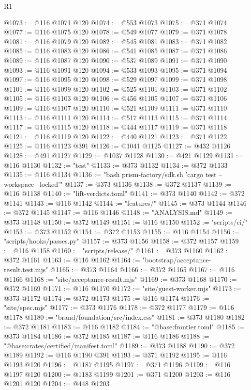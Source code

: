 \begin{lexlean}{R1}
\begin{coremodule}
@1073 := @116 @1071 @120
@1074 := @553 @1073
@1075 := @371 @1074
@1077 := @116 @1075 @120
@1078 := @549 @1077
@1079 := @371 @1078
@1081 := @116 @1079 @120
@1082 := @545 @1081
@1083 := @371 @1082
@1085 := @116 @1083 @120
@1086 := @541 @1085
@1087 := @371 @1086
@1089 := @116 @1087 @120
@1090 := @537 @1089
@1091 := @371 @1090
@1093 := @116 @1091 @120
@1094 := @533 @1093
@1095 := @371 @1094
@1097 := @116 @1095 @120
@1098 := @529 @1097
@1099 := @371 @1098
@1101 := @116 @1099 @120
@1102 := @525 @1101
@1103 := @371 @1102
@1105 := @116 @1103 @120
@1106 := @456 @1105
@1107 := @371 @1106
@1109 := @116 @1107 @120
@1110 := @521 @1109
@1111 := @371 @1110
@1113 := @116 @1111 @120
@1114 := @517 @1113
@1115 := @371 @1114
@1117 := @116 @1115 @120
@1118 := @444 @1117
@1119 := @371 @1118
@1121 := @116 @1119 @120
@1122 := @440 @1121
@1123 := @371 @1122
@1125 := @116 @1123 @391
@1126 := @1041 @1125
@1127 := @432 @1126
@1128 := @491 @1127
@1129 := @1037 @1128
@1130 := @421 @1129
@1131 := @116 @1130
@1132 := "test"
@1133 := @373 @1132
@1134 := @372 @1133
@1135 := @116 @1134
@1136 := "bash prism-factory/sdk.sh 'cargo test --workspace --locked'"
@1137 := @373 @1136
@1138 := @372 @1137
@1139 := @116 @1138
@1140 := "lift-verdicts.toml"
@1141 := @373 @1140
@1142 := @372 @1141
@1143 := @116 @1142
@1144 := "features/"
@1145 := @373 @1144
@1146 := @372 @1145
@1147 := @116 @1146
@1148 := "ANALYSIS.md"
@1149 := @373 @1148
@1150 := @372 @1149
@1151 := @116 @1150
@1152 := "scripts/ci/"
@1153 := @373 @1152
@1154 := @372 @1153
@1155 := @116 @1154
@1156 := "scripts/hooks/passes.py"
@1157 := @373 @1156
@1158 := @372 @1157
@1159 := @116 @1158
@1160 := "scripts/release/"
@1161 := @373 @1160
@1162 := @372 @1161
@1163 := @116 @1162
@1164 := "bootstrap/acceptance-result.test.mjs"
@1165 := @373 @1164
@1166 := @372 @1165
@1167 := @116 @1166
@1168 := "site/acceptance-result.mjs"
@1169 := @373 @1168
@1170 := @372 @1169
@1171 := @116 @1170
@1172 := "site/guest-worker.mjs"
@1173 := @373 @1172
@1174 := @372 @1173
@1175 := @116 @1174
@1176 := "site/spec.mjs"
@1177 := @373 @1176
@1178 := @372 @1177
@1179 := @116 @1178
@1180 := "brand/foundation/src/index.css"
@1181 := @373 @1180
@1182 := @372 @1181
@1183 := @116 @1182
@1184 := "@base:frontier.toml"
@1185 := @373 @1184
@1186 := @372 @1185
@1187 := @116 @1186
@1188 := "@base:crates/certified/manifest.toml"
@1189 := @373 @1188
@1190 := @372 @1189
@1192 := @116 @1190 @391
@1193 := @371 @1192
@1195 := @116 @1193 @120
@1196 := @1187 @1195
@1197 := @371 @1196
@1199 := @116 @1197 @120
@1200 := @1183 @1199
@1201 := @371 @1200
@1203 := @116 @1201 @120
@1204 := @448 @1203

\end{coremodule}
\end{lexlean}
